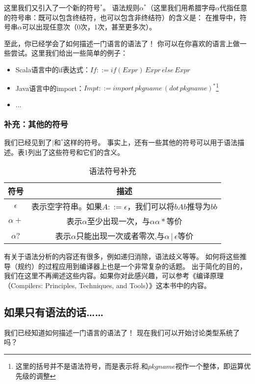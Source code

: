 \documentclass[../main.tex]{subfiles}
\begin{document}
  \indent 这里我们又引入了一个新的符号${}^*$。
  语法规则$\alpha^*$（这里我们用希腊字母$\alpha$代指任意的符号串：既可以包含终结符，也可以包含非终结符）的含义是：
  在推导中，符号串$\alpha$可以出现任意次（0次，1次，甚至更多次）。

  \indent 至此，你已经学会了如何描述一门语言的语法了！
  你可以在你喜欢的语言上做一些尝试。这里我们给出一些简单的例子：

  \begin{itemize}
    \item Scala语言中的if表达式：$If ::= if(Expr)\,Expr\,else\,Expr$
    \item Java语言中的import：$Impt ::= import\,pkgname\,(dot\,pkgname)^*$\footnote[1]{这里的括号并不是语法符号，而是表示将$.$和$pkgname$视作一个整体，即运算优先级的调整}
    \item $\dots$
  \end{itemize}

  \subsubsection*{补充：其他的符号}
    \indent 我们已经见到了$|$和${}^*$这样的符号。
    事实上，还有一些其他的符号可以用于语法描述。表1列出了这些符号和它们的含义。

    \begin{table}[h!]
      \centering
      \begin{tabular}{|c|c|}
        \hline
        符号 & 描述\\
        \hline
        $\epsilon$ & 表示空字符串。如果$A ::= \epsilon$，我们可以将$bAb$推导为$bb$ \\
        \hline
        $\alpha+$ & 表示$\alpha$至少出现一次，与$\alpha\alpha*$等价 \\
        \hline
        $\alpha?$ & 表示$\alpha$只能出现一次或者零次,与$\alpha\,|\,\epsilon$等价 \\
        \hline
      \end{tabular}
      \caption{语法符号补充}
    \end{table}

    \indent 

  \indent 有关于语法分析的内容还有很多，例如递归消除，语法歧义等等。
  如何将这些推导（规约）的过程应用到编译器上也是一个非常复杂的话题。
  出于简化的目的，我们在这里不再阐述这些内容。如果你对此感兴趣，可以参考《编译原理（Compilers: Principles, Techniques, and Tools）》这本书中的内容。

  \subsection{如果只有语法的话……}
  \indent 我们已经知道如何描述一门语言的语法了！
  现在我们可以开始讨论类型系统了吗？
\end{document}
